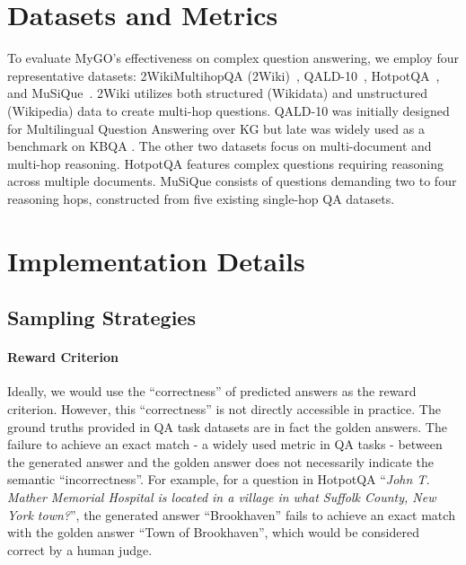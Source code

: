  \section{Datasets and Metrics}
 \label{appendix_datasets}
To evaluate MyGO's effectiveness on complex question answering, we employ four representative datasets: 2WikiMultihopQA (2Wiki)~\cite{ho2020constructing}, QALD-10~\cite{QALD-10}, HotpotQA~\cite{yang2018hotpotqa}, and MuSiQue~\cite{trivedi2021musique}.
2Wiki utilizes both structured (Wikidata) and unstructured (Wikipedia) data to create multi-hop questions.
QALD-10 was initially designed for Multilingual Question Answering over KG but late was widely used as a benchmark on KBQA \cite{ToG}.
The other two datasets focus on multi-document and multi-hop reasoning. HotpotQA features complex questions requiring reasoning across multiple documents. MuSiQue consists of questions demanding two to four reasoning hops, constructed from five existing single-hop QA datasets.


\section{Implementation Details}
\label{appendix_implementation_detail}
\subsection{Sampling Strategies}

\paragraph{Reward Criterion}

Ideally, we would use the ``correctness'' of predicted answers as the reward criterion.
However, this ``correctness'' is not directly accessible in practice.
The ground truths provided in QA task datasets are in fact the golden answers.
The failure to achieve an exact match - a widely used metric in QA tasks - between the generated answer and the golden answer does not necessarily indicate the semantic ``incorrectness''.
For example, for a question in HotpotQA ``\emph{John T. Mather Memorial Hospital is located in a village in what Suffolk County, New York town?}'', 
the generated answer ``Brookhaven'' fails to achieve an exact match with the golden answer ``Town of Brookhaven'', which would be considered correct by a human judge.

